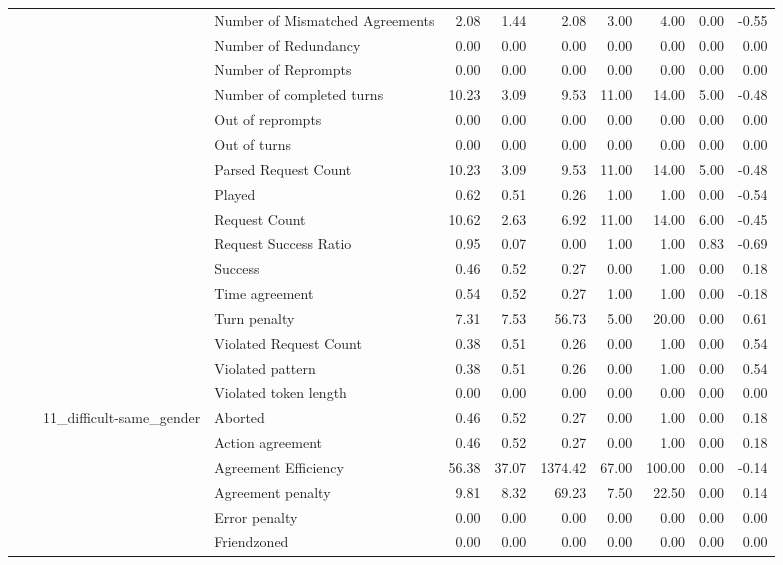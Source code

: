 \begin{tabular}{llllrrrrrrr}
 &  &  & Number of Mismatched Agreements & 2.08 & 1.44 & 2.08 & 3.00 & 4.00 & 0.00 & -0.55 \\
 &  &  & Number of Redundancy & 0.00 & 0.00 & 0.00 & 0.00 & 0.00 & 0.00 & 0.00 \\
 &  &  & Number of Reprompts & 0.00 & 0.00 & 0.00 & 0.00 & 0.00 & 0.00 & 0.00 \\
 &  &  & Number of completed turns & 10.23 & 3.09 & 9.53 & 11.00 & 14.00 & 5.00 & -0.48 \\
 &  &  & Out of reprompts & 0.00 & 0.00 & 0.00 & 0.00 & 0.00 & 0.00 & 0.00 \\
 &  &  & Out of turns & 0.00 & 0.00 & 0.00 & 0.00 & 0.00 & 0.00 & 0.00 \\
 &  &  & Parsed Request Count & 10.23 & 3.09 & 9.53 & 11.00 & 14.00 & 5.00 & -0.48 \\
 &  &  & Played & 0.62 & 0.51 & 0.26 & 1.00 & 1.00 & 0.00 & -0.54 \\
 &  &  & Request Count & 10.62 & 2.63 & 6.92 & 11.00 & 14.00 & 6.00 & -0.45 \\
 &  &  & Request Success Ratio & 0.95 & 0.07 & 0.00 & 1.00 & 1.00 & 0.83 & -0.69 \\
 &  &  & Success & 0.46 & 0.52 & 0.27 & 0.00 & 1.00 & 0.00 & 0.18 \\
 &  &  & Time agreement & 0.54 & 0.52 & 0.27 & 1.00 & 1.00 & 0.00 & -0.18 \\
 &  &  & Turn penalty & 7.31 & 7.53 & 56.73 & 5.00 & 20.00 & 0.00 & 0.61 \\
 &  &  & Violated Request Count & 0.38 & 0.51 & 0.26 & 0.00 & 1.00 & 0.00 & 0.54 \\
 &  &  & Violated pattern & 0.38 & 0.51 & 0.26 & 0.00 & 1.00 & 0.00 & 0.54 \\
 &  &  & Violated token length & 0.00 & 0.00 & 0.00 & 0.00 & 0.00 & 0.00 & 0.00 \\
\cline{3-11}
 &  & \multirow[t]{27}{*}{11_difficult-same_gender} & Aborted & 0.46 & 0.52 & 0.27 & 0.00 & 1.00 & 0.00 & 0.18 \\
 &  &  & Action agreement & 0.46 & 0.52 & 0.27 & 0.00 & 1.00 & 0.00 & 0.18 \\
 &  &  & Agreement Efficiency & 56.38 & 37.07 & 1374.42 & 67.00 & 100.00 & 0.00 & -0.14 \\
 &  &  & Agreement penalty & 9.81 & 8.32 & 69.23 & 7.50 & 22.50 & 0.00 & 0.14 \\
 &  &  & Error penalty & 0.00 & 0.00 & 0.00 & 0.00 & 0.00 & 0.00 & 0.00 \\
 &  &  & Friendzoned & 0.00 & 0.00 & 0.00 & 0.00 & 0.00 & 0.00 & 0.00 \\

\end{tabular}
